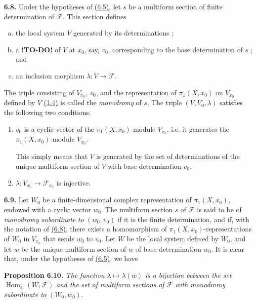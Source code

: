 \documentclass{report}
\newenvironment{itenv}[1]
  {\phantomsection\par\medskip\noindent\textbf{#1.}\itshape}
  {\par\medskip}
\newenvironment{rmenv}[1]
  {\phantomsection\par\medskip\noindent\textbf{#1.}\rmfamily}
  {\par\medskip}
\newcommand{\scr}[1]{{\mathscr{#1}}}
\newcommand{\CC}{\mathbb{C}}
\DeclareMathOperator{\Hom}{Hom}
\newcommand{\todo}{\textbf{ !TO-DO! }}
\newcommand{\oldpage}[1]{\marginpar{\footnotesize$\Big\vert$ \textit{p.~#1}}}
\begin{document}
\begin{rmenv}{6.8}
\label{I.6.8}
  Under the hypotheses of \hyperref[I.6.5]{(6.5)}, let $s$ be a multiform section of finite determination of $\scr{F}$.
  This section defines
\oldpage{39}
  \begin{enumerate}[a)]
    \item the local system $V$ generated by its determinations ;
    \item a \todo of $V$ at $x_0$, say, $v_0$, corresponding to the base determination of $s$ ; and
    \item an inclusion morphism $\lambda\colon V\to\scr{F}$.
  \end{enumerate}

  The triple consisting of $V_{x_0}$, $v_0$, and the representation of $\pi_1(X,x_0)$ on $V_{x_0}$ defined by $V$ \hyperref[I.1.4]{(1.4)} is called the \emph{monodromy} of $s$.
  The triple $(V,V_0,\lambda)$ satisfies the following two conditions.
  \begin{enumerate}
    \item[(6.8.1)]\label{I.6.8.1}
      $v_0$ is a cyclic vector of the $\pi_1(X,x_0)$-module $V_{x_0}$, i.e. it generates the $\pi_1(X,x_0)$-module $V_{x_0}$.

      This simply means that $V$ is generated by the set of determinations of the unique multiform section of $V$ with base determination $v_0$.
    \item[(6.8.2)]\label{I.6.8.2}
      $\lambda\colon V_{x_0}\to\scr{F}_{x_0}$ is injective.
  \end{enumerate}
\end{rmenv}

\begin{rmenv}{6.9}
\label{I.6.9}
  Let $W_0$ be a finite-dimensional complex representation of $\pi_1(X,x_0)$, endowed with a cyclic vector $w_0$.
  The multiform section $s$ of $\scr{F}$ is said to be of \emph{monodromy subordinate to $(w_0,v_0)$} if it is the finite determination, and if, with the notation of \hyperref[I.6.8]{(6.8)}, there exists a homomorphism of $\pi_1(X,x_0)$-representations of $W_0$ in $V_{x_0}$ that sends $w_0$ to $v_0$.
  Let $W$ be the local system defined by $W_0$, and let $w$ be the unique multiform section of $w$ of base determination $w_0$.
  It is clear that, under the hypotheses of \hyperref[I.6.5]{(6.5)}, we have
\end{rmenv}

\begin{itenv}{Proposition 6.10}
\label{I.6.10}
  The function $\lambda\mapsto\lambda(w)$ is a bijection between the set $\Hom_\CC(W,\scr{F})$ and the set of multiform sections of $\scr{F}$ with monodromy subordinate to $(W_0,w_0)$.
\end{itenv}
\end{document}
